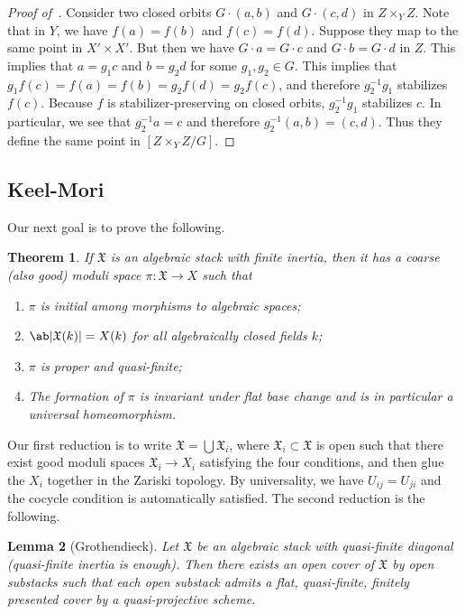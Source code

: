 \documentclass{amsart}
\newtheorem{thm}{Theorem}[section]
\newtheorem{lem}[thm]{Lemma}
\theoremstyle{definition}
\theoremstyle{remark}
\theoremstyle{plain}
\theoremstyle{definition}
\theoremstyle{remark}
\newcommand{\mf}[1]{\mathfrak{#1}}
\newcommand{\1}{\mathbf{1}}
\newcommand{\2}{\mathbf{2}}
\newcommand{\3}{\mathbf{3}}
\begin{document}
\begin{proof}[Proof of~]
    Consider two closed orbits \(G \cdot (a,b)\) and \(G \cdot (c,d)\) in \(Z \times_Y Z\). Note that in \(Y\), we have \(f(a) = f(b)\) and \(f(c) = f(d)\). Suppose they map to the same point in \(X' \times X'\). But then we have \(G \cdot a = G \cdot c\) and \(G \cdot b = G \cdot d\) in \(Z\). This implies that \(a = g_1 c\) and \(b = g_2 d\) for some \(g_1, g_2 \in G\). This implies that \(g_1 f(c) = f(a) = f(b) = g_2 f(d) = g_2 f(c)\), and therefore \(g_2^{-1} g_1\) stabilizes \(f(c)\). Because \(f\) is stabilizer-preserving on closed orbits, \(g_2^{-1}g_1\) stabilizes \(c\). In particular, we see that \(g_2^{-1}a = c\) and therefore \(g_2^{-1}(a,b) = (c,d)\). Thus they define the same point in \([Z \times_Y Z / G]\).
\end{proof}

\subsection{Keel-Mori}%
\label{sub:Keel-Mori}

Our next goal is to prove the following.

\begin{thm}
    If \(\mf{X}\) is an algebraic stack with finite inertia, then it has a coarse (also good) moduli space \(\pi \colon \mf{X} \to X\) such that
\begin{enumerate}
    \item \(\pi\) is initial among morphisms to algebraic spaces;
    \item \(\ab|\mf{X}(k)| = X(k)\) for all algebraically closed fields \(k\);
    \item \(\pi\) is proper and quasi-finite;
    \item The formation of \(\pi\) is invariant under flat base change and is in particular a universal homeomorphism.
\end{enumerate}
\end{thm}

Our first reduction is to write \(\mf{X} = \bigcup \mf{X}_i\), where \(\mf{X}_i \subset \mf{X}\) is open such that there exist good moduli spaces \(\mf{X}_i \to X_i\) satisfying the four conditions, and then glue the \(X_i\) together in the Zariski topology. By universality, we have \(U_{ij} = U_{ji}\) and the cocycle condition is automatically satisfied. The second reduction is the following.
\begin{lem}[Grothendieck]
    Let \(\mf{X}\) be an algebraic stack with quasi-finite diagonal (quasi-finite inertia is enough). Then there exists an open cover of \(\mf{X}\) by open substacks such that each open substack admits a flat, quasi-finite, finitely presented cover by a quasi-projective scheme.
\end{lem}
\end{document}
